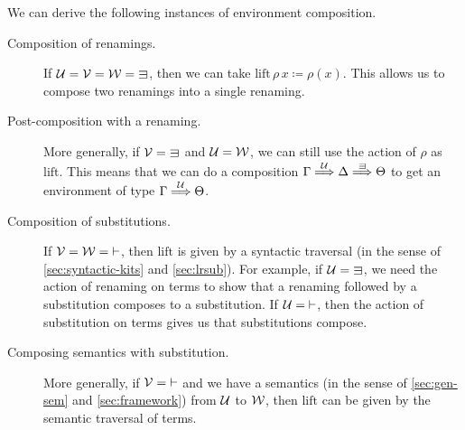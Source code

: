 \begin{example}
  We can derive the following instances of environment composition.
  \begin{description}
    \item[Composition of renamings.]
      If $\U = \V = \W = {\sqni}$, then we can take
      $\mathrm{lift}\,\rho\,x \coloneqq \rho(x)$.
      This allows us to compose two renamings into a single renaming.
    \item[Post-composition with a renaming.]
      More generally, if $\V = {\sqni}$ and $\mathcal U = \mathcal W$, we can still use
      the action of $\rho$ as $\mathrm{lift}$.
      This means that we can do a composition
      $\Gamma \env\U \Delta \env\sqni \Theta$ to get an environment of type
      $\Gamma \stackrel{\mathcal U}\Longrightarrow \Theta$.
    \item[Composition of substitutions.]
      If $\mathcal V = \mathcal W = {\vdash}$, then $\mathrm{lift}$ is given by a
      syntactic traversal (in the sense of \cref{sec:syntactic-kits} and
      \cref{sec:lrsub}).
      For example, if $\U = {\sqni}$, we need the action of renaming on terms
      to show that a renaming followed by a substitution composes to a
      substitution.
      If $\mathcal U = {\vdash}$, then the action of substitution on terms gives us that
      substitutions compose.
    \item[Composing semantics with substitution.]
      More generally, if $\mathcal V = {\vdash}$ and we have a semantics (in the sense of
      \cref{sec:gen-sem} and \cref{sec:framework}) from
      $\mathcal U$ to $\mathcal W$, then $\mathrm{lift}$ can be given by the semantic traversal
      of terms.
  \end{description}
\end{example}


%

